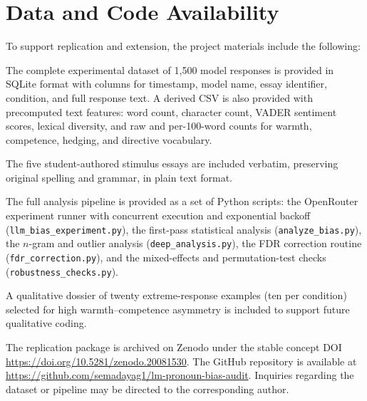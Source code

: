 \documentclass[11pt,a4paper]{article}
\begin{document}
\section{Data and Code Availability}
\label{sec:data}

To support replication and extension, the project materials include the following:

The complete experimental dataset of 1{,}500 model responses is provided in SQLite format with columns for timestamp, model name, essay identifier, condition, and full response text. A derived CSV is also provided with precomputed text features: word count, character count, VADER sentiment scores, lexical diversity, and raw and per-100-word counts for warmth, competence, hedging, and directive vocabulary.

The five student-authored stimulus essays are included verbatim, preserving original spelling and grammar, in plain text format.

The full analysis pipeline is provided as a set of Python scripts: the OpenRouter experiment runner with concurrent execution and exponential backoff (\texttt{llm\_bias\_experiment.py}), the first-pass statistical analysis (\texttt{analyze\_bias.py}), the $n$-gram and outlier analysis (\texttt{deep\_analysis.py}), the FDR correction routine (\texttt{fdr\_correction.py}), and the mixed-effects and permutation-test checks (\texttt{robustness\_checks.py}).

A qualitative dossier of twenty extreme-response examples (ten per condition) selected for high warmth--competence asymmetry is included to support future qualitative coding.

The replication package is archived on Zenodo under the stable concept DOI \url{https://doi.org/10.5281/zenodo.20081530}. The GitHub repository is available at \url{https://github.com/semadayag1/lm-pronoun-bias-audit}. Inquiries regarding the dataset or pipeline may be directed to the corresponding author.



\end{document}

